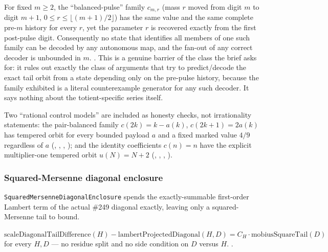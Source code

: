 \begin{obs}
For fixed $m\ge 2$, the ``balanced-pulse'' family
$c_{m,r}$ (mass $r$ moved from digit $m$ to digit $m{+}1$, $0\le r\le
\lfloor(m{+}1)/2\rfloor$) has the same value and the same complete
pre-$m$ history for every $r$, yet the parameter $r$ is recovered exactly
from the first post-pulse digit. Consequently no state that identifies all
members of one such family can be decoded by any autonomous map, and the
fan-out of any correct decoder is unbounded in $m$.
\quad {}
\quad {} \quad {} \quad {}.
This is a genuine barrier of the class the brief asks for: it rules out
exactly the class of arguments that try to predict/decode the exact tail
orbit from a state depending only on the pre-pulse history, because the
family exhibited is a literal counterexample generator for any such decoder.
It says nothing about the totient-specific series itself.
\end{obs}

Two ``rational control models'' are included as honesty checks, not
irrationality statements: the pair-balanced family
$c(2k){=}k{-}a(k)$, $c(2k{+}1){=}2a(k)$ has tempered orbit for every bounded
payload $a$ and a fixed marked value $4/9$ regardless of $a$
(,
, , ); and the
identity coefficients $c(n)=n$ have the explicit multiplier-one tempered
orbit $u(N)=N+2$
(,
, , ).

\subsubsection{Squared-Mersenne diagonal enclosure}

\texttt{SquaredMersenneDiagonalEnclosure} spends the exactly-summable
first-order Lambert term of the actual \#249 diagonal exactly, leaving only
a squared-Mersenne tail to bound.

\begin{prop}
$\mathrm{scaleDiagonalTailDifference}(H) - \mathrm{lambertProjectedDiagonal}(H,D)
= C_H \cdot \mathrm{mobiusSquareTail}(D)$ for every $H,D$ --- no residue split
and no side condition on $D$ versus $H$.
\quad {} \quad {} \quad {}.
\end{prop}

